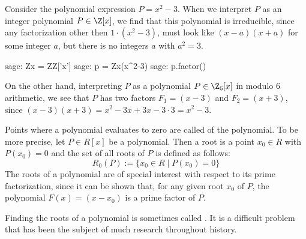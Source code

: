 \begin{example}
\label{example:irreducible_integer_polynomial_1}
 Consider the polynomial expression $P=x^2-3$. When we interpret $P$ as an integer polynomial $P\in\Z[x]$, we find that this polynomial is irreducible, since any factorization other then $1\cdot(x^2-3)$, must look like $(x-a)(x+a)$ for some integer $a$, but there is no integers $a$ with $a^2=3$.
\begin{sagecommandline}
sage: Zx = ZZ['x']
sage: p = Zx(x^2-3)
sage: p.factor()
\end{sagecommandline}
On the other hand, interpreting $P$ as a polynomial $P\in \Z_6[x]$ in modulo $6$ arithmetic, we see that $P$ has two factors $F_1=(x-3)$ and $F_2=(x+3)$, since
$(x-3)(x+3)= x^2 -3x +3x -3\cdot 3= x^2-3$.
\end{example}
Points where a polynomial evaluates to zero are called  of the polynomial. To be more precise, let $P\in R[x]$ be a polynomial. Then a root is a point $x_0\in R$ with $P(x_0)=0$ and the set of all roots of $P$ is defined as follows:
\begin{equation}
R_0(P):=\{x_0\in R\;|\; P(x_0)=0\}
\end{equation}
The roots of a polynomial are of special interest with respect to its prime factorization, since it can be shown that, for any given root $x_0$ of $P$, the polynomial $F(x)=(x-x_0)$ is a prime factor of $P$.

Finding the roots of a polynomial is sometimes called . It is a difficult problem that has been the subject of much research throughout history.

